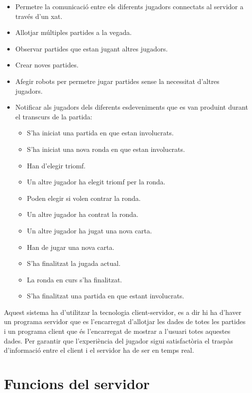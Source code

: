 \begin{itemize}
\item{Permetre la comunicació entre els diferents jugadors connectats al servidor a través d'un xat.}
\item{Allotjar múltiples partides a la vegada.}
\item{Observar partides que estan jugant altres jugadors.}
\item{Crear noves partides.}
\item{Afegir robots per permetre jugar partides sense la necessitat d'altres jugadors.}
\item{
    Notificar als jugadors dels diferents esdeveniments que es van produint durant el transcurs de la partida:
    \begin{itemize}
        \item{S'ha iniciat una partida en que estan involucrats.}
        \item{S'ha iniciat una nova ronda en que estan involucrats.}
        \item{Han d'elegir triomf.}
        \item{Un altre jugador ha elegit triomf per la ronda.}
        \item{Poden elegir si volen contrar la ronda.}
        \item{Un altre jugador ha contrat la ronda.}
        \item{Un altre jugador ha jugat una nova carta.}
        \item{Han de jugar una nova carta.}
        \item{S'ha finalitzat la jugada actual.}
        \item{La ronda en curs s'ha finalitzat.}
        \item{S'ha finalitzat una partida en que estant involucrats.}
    \end{itemize}
}
\end{itemize}

Aquest sistema ha d'utilitzar la tecnologia client-servidor, es a dir hi ha d'haver un programa servidor que es l'encarregat d'allotjar les dades de totes les partides i un programa client que és l'encarregat de mostrar a l'usuari totes aquestes dades. Per garantir que l'experiència del jugador sigui satisfactòria el traspàs d'informació entre el client i el servidor ha de ser en temps real. 

\section{Funcions del servidor}

